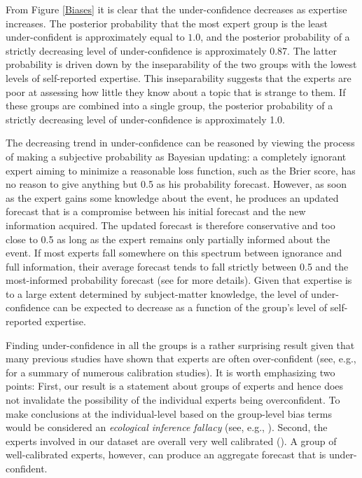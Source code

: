 \documentclass[aoas, preprint]{imsart}
\numberwithin{equation}{section}
\theoremstyle{plain}
\begin{document}
From Figure \ref{Biases} it is clear that the under-confidence decreases as expertise increases.  The posterior probability that the most expert group is the least under-confident is approximately equal to $1.0$, and the posterior probability of a strictly decreasing level of under-confidence is approximately 0.87. The latter probability is driven down by the inseparability of the two groups with the lowest levels of self-reported expertise. This inseparability suggests that the experts are poor at assessing how little they know about a topic that is strange to them. If these groups are combined into a single group, the posterior probability of a strictly decreasing level of under-confidence is approximately 1.0. 

The decreasing trend in under-confidence can be reasoned by viewing the process of making a subjective probability  as Bayesian updating: a completely ignorant expert aiming to minimize a reasonable loss function, such as the Brier score, has no reason to give anything but 0.5 as his probability forecast. However, as soon as the expert gains some knowledge about the event, he produces an updated forecast that is a compromise between his initial forecast and the new information acquired. The updated forecast is therefore conservative and too close to 0.5 as long as the expert remains only partially informed about the event. If most experts fall somewhere on this spectrum between ignorance and full information, their average forecast tends to fall strictly between 0.5 and the most-informed probability forecast (see \citet{Baron} for more details). Given that expertise is to a large extent determined by subject-matter knowledge, the level of under-confidence can be expected to decrease as a function of the group's level of self-reported expertise.

Finding under-confidence in all the groups is a rather surprising result given that many previous studies have shown that experts are often over-confident (see, e.g., \citet{lichtenstein1977calibration, morgan1992uncertainty, bier2004implications} for a summary of numerous calibration studies). It is worth emphasizing two points: First, our result is a statement about groups of experts and hence does not invalidate the possibility of the individual experts being overconfident. To make conclusions at the individual-level based on the group-level bias terms would be considered an \textit{ecological inference fallacy} (see, e.g., \citet{lubinski1996seeing}). Second, the experts involved in our dataset are overall very well calibrated (\cite{mellers}). A group of well-calibrated experts, however, can produce an aggregate forecast that is under-confident.
\end{document}
